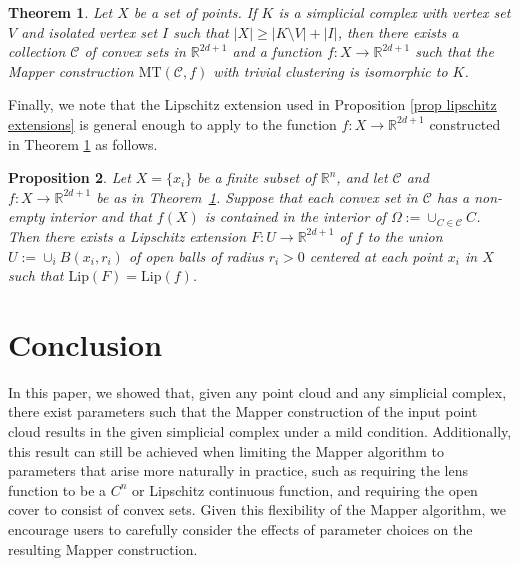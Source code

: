 \documentclass[reqno,oneside,11pt]{amsart}
\newtheorem{theorem}{Theorem}[section]
\newtheorem{prop}[theorem]{Proposition}
\theoremstyle{definition}
\theoremstyle{remark}
\newcommand{\MT}{\text{MT}}
\def\R{\mathbb{R}}
\begin{document}
\begin{theorem}\label{thm: convex sets in R2d+1}
Let $X$ be a set of points. If $K$ is a simplicial complex with vertex set $V$ and isolated vertex set $I$ such that $|X| \geq |K\setminus V|+|I|$, then there exists a collection $\mathcal{C}$ of convex sets in $\mathbb{R}^{2d+1}$ and a function \mbox{$f \colon X \to \mathbb{R}^{2d+1}$} such that the Mapper construction $\MT(\mathcal{C}, f)$ with trivial clustering is isomorphic to $K$. 
\label{theorem:convex-sets-d}
\end{theorem}

Finally, we note that the Lipschitz extension used in Proposition \ref{prop lipschitz extensions} is general enough to apply to the function $f \colon X \to \mathbb{R}^{2d + 1}$ constructed in Theorem \ref{thm: convex sets in R2d+1} as follows. 
\begin{prop}\label{prop: extension in general Euclidean space}
Let $X = \{x_i\}$ be a finite subset of $\R^n$, and let $\mathcal{C}$ and $f \colon X \to \mathbb{R}^{2d + 1}$ be as in Theorem~\ref{thm: convex sets in R2d+1}. Suppose that each convex set in $\mathcal{C}$ has a non-empty interior and that $f(X)$ is contained in the interior of $\Omega:= \cup_{C \in \mathcal{C}} C$. 
Then there exists a Lipschitz extension $F: U \to \mathbb{R}^{2d+1}$ of $f$ to the union $U := \cup_i B(x_i, r_i)$ of open balls of radius $r_i > 0$ centered at each point $x_i$ in $X$ such that $\mathrm{Lip}(F) = \mathrm{Lip}(f)$.
\end{prop}

\section{Conclusion}
In this paper, we showed that, given any point cloud and any simplicial complex, there exist parameters such that the Mapper construction of the input point cloud results in the given simplicial complex under a mild condition. Additionally, this result can still be achieved when limiting the Mapper algorithm to parameters that arise more naturally in practice, such as requiring the lens function to be a $C^n$ or Lipschitz continuous function, and requiring the open cover to consist of convex sets. Given this flexibility of the Mapper algorithm, we encourage users to carefully consider the effects of parameter choices on the resulting Mapper construction.

%

%

%
\end{document}
